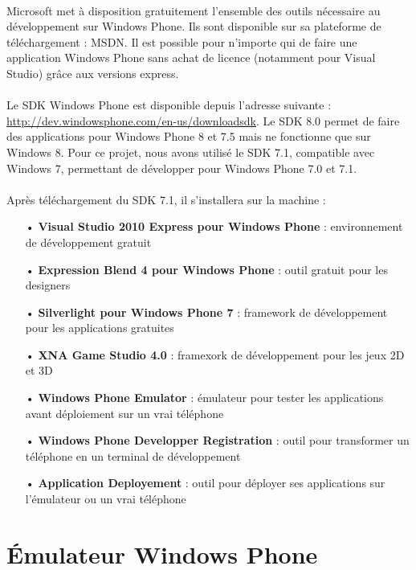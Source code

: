 \documentclass[twoside,UTF8]{EPURapport}
\begin{document}
\paragraph{}
Microsoft met à disposition gratuitement l'ensemble des outils nécessaire au développement sur Windows Phone. Ils sont disponible sur sa plateforme de téléchargement : MSDN. Il est possible pour n'importe qui de faire une application Windows Phone sans achat de licence (notamment pour Visual Studio) grâce aux versions express. 
	
\paragraph{}
Le SDK Windows Phone est disponible depuis l'adresse suivante :       \url{http://dev.windowsphone.com/en-us/downloadsdk}. Le SDK 8.0 permet de faire des applications pour Windows Phone 8 et 7.5 mais ne fonctionne que sur Windows 8. Pour ce projet, nous avons utilisé le SDK 7.1, compatible avec Windows 7, permettant de développer pour Windows Phone 7.0 et 7.1. 

\paragraph{}
Après téléchargement du SDK 7.1, il s'installera sur la machine : 
\begin{itemize}
	\item[•]\textbf{Visual Studio 2010 Express pour Windows Phone} : environnement de développement gratuit
	\item[•]\textbf{Expression Blend 4 pour Windows Phone} : outil gratuit pour les designers
	\item[•]\textbf{Silverlight pour Windows Phone 7} : framework de développement pour les applications gratuites
	\item[•]\textbf{XNA Game Studio 4.0} : framexork de développement pour les jeux 2D et 3D
	\item[•]\textbf{Windows Phone Emulator} : émulateur pour tester les applications avant déploiement sur un vrai téléphone
	\item[•]\textbf{Windows Phone Developper Registration} : outil pour transformer un téléphone en un terminal de développement
	\item[•]\textbf{Application Deployement} : outil pour déployer ses applications sur l'émulateur ou un vrai téléphone
\end{itemize}
	
	\section{\'Emulateur Windows Phone}
\end{document}
